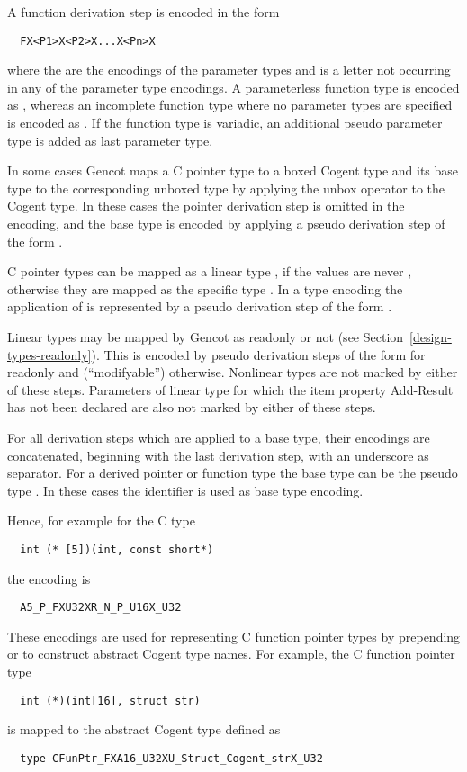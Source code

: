A function derivation step is encoded in the form
\begin{verbatim}
  FX<P1>X<P2>X...X<Pn>X
\end{verbatim}
where the  are the encodings of the parameter types and  is a letter not occurring in 
any of the parameter type encodings. A parameterless function type is encoded as , whereas an
incomplete function type where no parameter types are specified is encoded as .
If the function type is variadic, an additional pseudo parameter type 
is added as last parameter type. 

In some cases Gencot maps a C pointer type to a boxed Cogent type and its base type to the corresponding
unboxed type by applying the unbox operator \code{\#} to the Cogent type. In these cases the pointer derivation
step is omitted in the encoding, and the base type is encoded by applying a pseudo derivation step 
of the form .

C pointer types can be mapped as a linear type , if the values are never , otherwise they are mapped
as the specific type . In a type encoding the application of  is represented by
a pseudo derivation step of the form .

Linear types may be mapped by Gencot as readonly or not (see Section~\ref{design-types-readonly}). 
This is encoded by pseudo derivation steps of the form  for readonly and  (``modifyable'')
otherwise. Nonlinear types are not marked by either of these steps. Parameters of linear type for 
which the item property Add-Result has not been declared are also not
marked by either of these steps.

For all derivation steps which are applied to a base type, their encodings are concatenated, beginning with the 
last derivation step, with an underscore \code{\_} as separator. For a derived pointer or 
function type the base type can be the pseudo type . In these cases the identifier  is
used as base type encoding.

Hence, for example for the C type
\begin{verbatim}
  int (* [5])(int, const short*)
\end{verbatim}
the encoding is
\begin{verbatim}
  A5_P_FXU32XR_N_P_U16X_U32
\end{verbatim}

These encodings are used for representing C function pointer types by prepending  or 
to construct abstract Cogent type names. For example, the C function pointer type
\begin{verbatim}
  int (*)(int[16], struct str)
\end{verbatim}
is mapped to the abstract Cogent type defined as
\begin{verbatim}
  type CFunPtr_FXA16_U32XU_Struct_Cogent_strX_U32
\end{verbatim}

